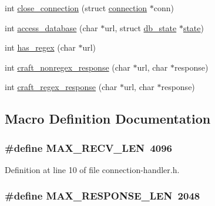 \begin{DoxyCompactItemize}
int \hyperlink{connection-handler_8h_a0171242e91a6a1c18938b8aba84625e5}{close\-\_\-connection} (struct \hyperlink{structconnection}{connection} $\ast$conn)
\item 
int \hyperlink{connection-handler_8h_a371095605bf8a8222590bc46b2d38b59}{access\-\_\-database} (char $\ast$url, struct \hyperlink{structdb__state}{db\-\_\-state} $\ast$\hyperlink{http__parser_8c_adc6e5733fc3c22f0a7b2914188c49c90}{state})
\item 
int \hyperlink{connection-handler_8h_aad4e23d034482bdd8a28174ff70d3ea0}{has\-\_\-regex} (char $\ast$url)
\item 
int \hyperlink{connection-handler_8h_a40ddee505082e691c9e94a8afda7d4b5}{craft\-\_\-nonregex\-\_\-response} (char $\ast$url, char $\ast$response)
\item 
int \hyperlink{connection-handler_8h_a7cb78a1a29fdde2658e016d01287bf7a}{craft\-\_\-regex\-\_\-response} (char $\ast$url, char $\ast$response)
\end{DoxyCompactItemize}


\subsection{Macro Definition Documentation}
\hypertarget{connection-handler_8h_a774d5c0d74bbc47fad33f175a0bd13f4}{
\subsubsection[{M\-A\-X\-\_\-\-R\-E\-C\-V\-\_\-\-L\-E\-N}]{\setlength{\rightskip}{0pt plus 5cm}\#define M\-A\-X\-\_\-\-R\-E\-C\-V\-\_\-\-L\-E\-N~4096}}\label{connection-handler_8h_a774d5c0d74bbc47fad33f175a0bd13f4}


Definition at line 10 of file connection-\/handler.\-h.

\hypertarget{connection-handler_8h_a9a83ff2f12aca569bc0f799a56e7a2c2}{
\subsubsection[{M\-A\-X\-\_\-\-R\-E\-S\-P\-O\-N\-S\-E\-\_\-\-L\-E\-N}]{\setlength{\rightskip}{0pt plus 5cm}\#define M\-A\-X\-\_\-\-R\-E\-S\-P\-O\-N\-S\-E\-\_\-\-L\-E\-N~2048}}\label{connection-handler_8h_a9a83ff2f12aca569bc0f799a56e7a2c2}


